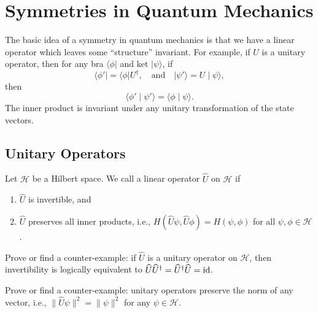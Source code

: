 \section{Symmetries in Quantum Mechanics}

\M
The basic idea of a symmetry in quantum mechanics is that we have a
linear operator which leaves some ``structure'' invariant. For example,
if $U$ is a unitary operator, then for any bra $\langle\phi|$ and ket
$|\psi\rangle$, if
\begin{equation}
\langle\phi'|=\langle\phi|U^{\dagger},\quad\mbox{and}\quad
|\psi'\rangle=U\mid\psi\rangle,
\end{equation}
then
\begin{equation}
\langle\phi'\mid\psi'\rangle = \langle\phi\mid\psi\rangle.
\end{equation}
The inner product is invariant under any unitary transformation of the
state vectors.

\subsection{Unitary Operators}

\begin{definition}\label{defn:qm:symmetry:unitary-operator}
Let $\mathcal{H}$ be a Hilbert space.
We call a linear operator $\widehat{U}$ on $\mathcal{H}$ 
if
\begin{enumerate}
\item $\widehat{U}$ is invertible, and
\item $\widehat{U}$ preserves all inner products, i.e.,
  $H(\widehat{U}\psi,\widehat{U}\phi)=H(\psi,\phi)$ for all
  $\psi,\phi\in\mathcal{H}$.
\end{enumerate}
\end{definition}

\begin{exercise}
Prove or find a counter-example: if $\widehat{U}$ is a unitary operator
on $\mathcal{H}$, then invertibility is logically equivalent to $\widehat{U}\widehat{U}^{\dagger}=\widehat{U}^{\dagger}\widehat{U}=\operatorname{id}$.
\end{exercise}

\begin{exercise}
Prove or find a counter-example: unitary operators preserve the norm of
any vector, i.e., $\|\widehat{U}\psi\|^{2}=\|\psi\|^{2}$ for any
$\psi\in\mathcal{H}$.
\end{exercise}

